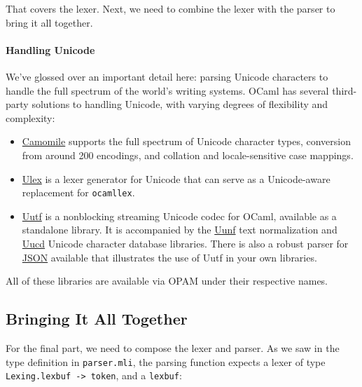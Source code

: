 That covers the lexer. Next, we need to combine the lexer with the
parser to bring it all together.

\hypertarget{handling-unicode}{%
\paragraph{Handling Unicode}\label{handling-unicode}}

We've glossed over an important detail here: parsing Unicode characters
to handle the full spectrum of the world's writing systems. OCaml has
several third-party solutions to handling Unicode, with varying degrees
of flexibility and complexity:

\begin{itemize}
\item
  \href{https://github.com/yoriyuki/Camomile}{Camomile} supports the
  full spectrum of Unicode character types, conversion from around 200
  encodings, and collation and locale-sensitive case mappings.
\item
  \href{http://www.cduce.org/ulex}{Ulex} is a lexer generator for
  Unicode that can serve as a Unicode-aware replacement for
  \passthrough{\lstinline!ocamllex!}.
\item
  \href{http://erratique.ch/software/uutf}{Uutf} is a nonblocking
  streaming Unicode codec for OCaml, available as a standalone library.
  It is accompanied by the
  \href{http://erratique.ch/software/uunf}{Uunf} text normalization and
  \href{http://erratique.ch/software/uucd}{Uucd} Unicode character
  database libraries. There is also a robust parser for
  \href{http://erratique.ch/software/jsonm}{JSON} available that
  illustrates the use of Uutf in your own libraries.
\end{itemize}

All of these libraries are available via OPAM under their respective
names.~

\hypertarget{bringing-it-all-together}{%
\subsection{Bringing It All Together}\label{bringing-it-all-together}}

For the final part, we need to compose the lexer and parser. As we saw
in the type definition in \passthrough{\lstinline!parser.mli!}, the
parsing function expects a lexer of type
\passthrough{\lstinline!Lexing.lexbuf -> token!}, and a
\passthrough{\lstinline!lexbuf!}: 

